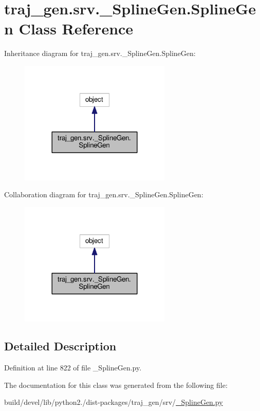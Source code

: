 \hypertarget{classtraj__gen_1_1srv_1_1___spline_gen_1_1_spline_gen}{}\section{traj\+\_\+gen.\+srv.\+\_\+\+Spline\+Gen.\+Spline\+Gen Class Reference}
\label{classtraj__gen_1_1srv_1_1___spline_gen_1_1_spline_gen}


Inheritance diagram for traj\+\_\+gen.\+srv.\+\_\+\+Spline\+Gen.\+Spline\+Gen\+:
\nopagebreak
\begin{figure}[H]
\begin{center}
\leavevmode
\includegraphics[width=204pt]{classtraj__gen_1_1srv_1_1___spline_gen_1_1_spline_gen__inherit__graph}
\end{center}
\end{figure}


Collaboration diagram for traj\+\_\+gen.\+srv.\+\_\+\+Spline\+Gen.\+Spline\+Gen\+:
\nopagebreak
\begin{figure}[H]
\begin{center}
\leavevmode
\includegraphics[width=204pt]{classtraj__gen_1_1srv_1_1___spline_gen_1_1_spline_gen__coll__graph}
\end{center}
\end{figure}


\subsection{Detailed Description}


Definition at line 822 of file \+\_\+\+Spline\+Gen.\+py.



The documentation for this class was generated from the following file\+:\begin{DoxyCompactItemize}
\item 
build/devel/lib/python2./dist-\/packages/traj\+\_\+gen/srv/\hyperlink{___spline_gen_8py}{\+\_\+\+Spline\+Gen.\+py}\end{DoxyCompactItemize}
